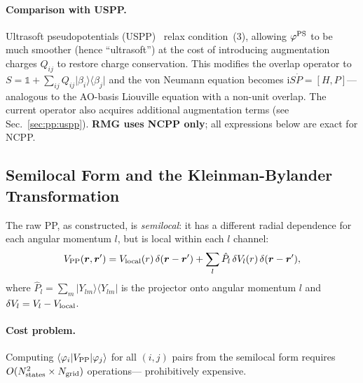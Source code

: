 \documentclass[12pt,letterpaper]{article}
\newcommand{\bra}[1]{\langle #1 \rvert}
\newcommand{\ket}[1]{\lvert #1 \rangle}
\newcommand{\mel}[3]{\langle #1 \vert #2 \vert #3 \rangle}
\newcommand{\ii}{\mathrm{i}}
\newcommand{\psiPS}{\varphi^{\rm PS}}
\begin{document}
\paragraph{Comparison with USPP.}
Ultrasoft pseudopotentials (USPP)~\cite{Vanderbilt1990} relax condition~(3),
allowing $\psiPS$ to be much smoother (hence ``ultrasoft'') at the cost of
introducing augmentation charges $Q_{ij}$ to restore charge conservation.
This modifies the overlap operator to $S = \mathbb{1} + \sum_{ij} Q_{ij}\ket{\beta_i}\bra{\beta_j}$
and the von Neumann equation becomes $\ii S\dot{P} = [H,P]$---analogous to
the AO-basis Liouville equation with a non-unit overlap.  The current operator
also acquires additional augmentation terms (see Sec.~\ref{sec:pp:uspp}).
\textbf{RMG uses NCPP only}; all expressions below are exact for NCPP.

\subsection{Semilocal Form and the Kleinman-Bylander Transformation}
\label{sec:pp:KB}

The raw PP, as constructed, is \emph{semilocal}: it has a different radial
dependence for each angular momentum $l$, but is local within each $l$ channel:
\begin{equation}
  V_{\rm PP}(\bm{r},\bm{r}') = V_{\rm local}(r)\,\delta(\bm{r}-\bm{r}')
  + \sum_l \hat{P}_l\,\delta V_l(r)\,\delta(\bm{r}-\bm{r}'),
  \label{eq:semilocal}
\end{equation}
where $\hat{P}_l = \sum_m \ket{Y_{lm}}\bra{Y_{lm}}$ is the projector onto
angular momentum $l$ and $\delta V_l = V_l - V_{\rm local}$.

\paragraph{Cost problem.}
Computing $\mel{\varphi_i}{V_{\rm PP}}{\varphi_j}$ for all $(i,j)$ pairs from the
semilocal form requires $O(N_{\rm states}^2 \times N_{\rm grid})$ operations---
prohibitively expensive.
\end{document}
